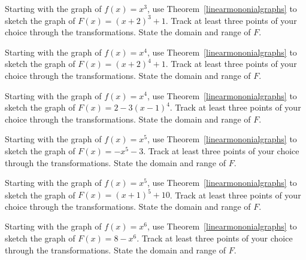 \documentclass{ximera}
\begin{document}
	\author{Stitz-Zeager}



\begin{problem}\label{polytransfirst}
     Starting with the graph of $f(x) = x^3$, use Theorem~\ref{linearmononialgraphs} to sketch the graph of $F(x) = (x + 2)^{3} + 1$. Track at least three points of your choice through the transformations. State the domain and range of $F$.

\end{problem}

\begin{problem}
     Starting with the graph of $f(x) = x^4$, use Theorem~\ref{linearmononialgraphs} to sketch the graph of $F(x) = (x + 2)^{4} + 1$. Track at least three points of your choice through the transformations. State the domain and range of $F$.
\end{problem}

\begin{problem}
     Starting with the graph of $f(x) = x^4$, use Theorem~\ref{linearmononialgraphs} to sketch the graph of $F(x) = 2 - 3(x - 1)^{4}$. Track at least three points of your choice through the transformations. State the domain and range of $F$.
\end{problem}

\begin{problem}
     Starting with the graph of $f(x) = x^5$, use Theorem~\ref{linearmononialgraphs} to sketch the graph of $F(x) = -x^5 - 3$. Track at least three points of your choice through the transformations. State the domain and range of $F$.
\end{problem}

\begin{problem}
     Starting with the graph of $f(x) = x^5$, use Theorem~\ref{linearmononialgraphs} to sketch the graph of $F(x) = (x + 1)^{5} + 10$. Track at least three points of your choice through the transformations. State the domain and range of $F$.
\end{problem}

\begin{problem}\label{polytranslast}
     Starting with the graph of $f(x) = x^6$, use Theorem~\ref{linearmononialgraphs} to sketch the graph of $F(x) = 8 - x^6$. Track at least three points of your choice through the transformations. State the domain and range of $F$.
\end{problem}
\end{document}
